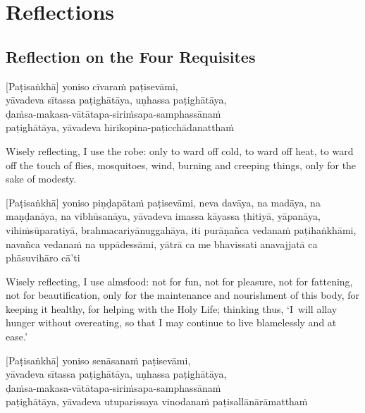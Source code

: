 \chapter{Reflections}

\section{Reflection on the Four Requisites}

\begin{leader}
\end{leader}


[Paṭisaṅkhā] yoniso cīvaraṁ paṭisevāmi,\\
yāvadeva sītassa paṭighātāya, uṇhassa paṭighātāya,\\
ḍaṁsa-makasa-vātātapa-siriṁsapa-samphassānaṁ\\
paṭighātāya, yāvadeva hirikopina-paṭicchādanatthaṁ

\begin{english}
  Wisely reflecting, I use the robe: only to ward off cold, to ward off heat, to
  ward off the touch of flies, mosquitoes, wind, burning and creeping things,
  only for the sake of modesty.
\end{english}

[Paṭisaṅkhā] yoniso piṇḍapātaṁ paṭisevāmi, neva davāya, na madāya, na maṇḍanāya,
na vibhūsanāya, yāvadeva imassa kāyassa ṭhitiyā, yāpanāya, vihiṁsūparatiyā,
brahmacariyānuggahāya, iti purāṇañca vedanaṁ paṭihaṅkhāmi, navañca vedanaṁ na
uppādessāmi, yātrā ca me bhavissati anavajjatā ca phāsuvihāro cā'ti

\begin{english}
  Wisely reflecting, I use almsfood: not for fun, not for pleasure, not for
  fattening, not for beautification, only for the maintenance and nourishment of
  this body, for keeping it healthy, for helping with the Holy Life; thinking
  thus, `I~will allay hunger without overeating, so that I may continue to live
  blamelessly and at ease.'
\end{english}

[Paṭisaṅkhā] yoniso senāsanaṁ paṭisevāmi,\\
yāvadeva sītassa paṭighātāya, uṇhassa paṭighātāya,\\
ḍaṁsa-makasa-vātātapa-siriṁsapa-samphassānaṁ\\
paṭighātāya, yāvadeva utuparissaya vinodanaṁ paṭisallānārāmatthaṁ

